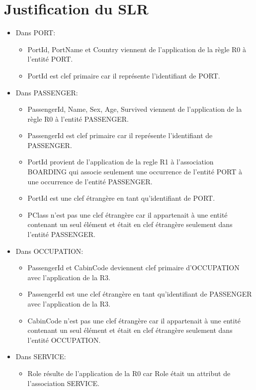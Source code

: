 \documentclass[12pt, a4paper, french]{article}
\begin{document}
\begin{sloppypar}
\newpage

\section{Justification du SLR}

\begin{itemize}
\item Dans PORT:
\begin{itemize}
    \item PortId, PortName et Country viennent de l'application de la règle R0 à l'entité PORT. 
	\item PortId est clef primaire car il représente l'identifiant de PORT.
\end{itemize}
\item Dans PASSENGER:
\begin{itemize}
    \item PassengerId, Name, Sex, Age, Survived viennent de l'application de la règle R0 à l'entité PASSENGER. 
	\item PassengerId est clef primaire car il représente l'identifiant de PASSENGER.
    \item PortId provient de l'application de la regle R1 à l'association BOARDING qui associe seulement une occurrence de l'entité PORT à une occurrence de l'entité PASSENGER.
    \item PortId est une clef étrangère en tant qu'identifiant de PORT.
    \item PClass n'est pas une clef étrangère car il appartenait à une entité contenant un seul élément et était en clef étrangère seulement dans l'entité PASSENGER.
\end{itemize}
\item Dans OCCUPATION:
\begin{itemize}
    \item PassengerId et CabinCode deviennent clef primaire d'OCCUPATION avec l'application de la R3.
    \item PassengerId est une clef étrangère en tant qu'identifiant de PASSENGER avec l'application de la R3.
    \item CabinCode n'est pas une clef étrangère car il appartenait à une entité contenant un seul élément et était en clef étrangère seulement dans l'entité OCCUPATION.
\end{itemize}
\item Dans SERVICE:
\begin{itemize}
    \item Role résulte de l'application de la R0 car Role était un attribut de l'association SERVICE.

\end{itemize}
\end{itemize}
\end{sloppypar}
\end{document}
